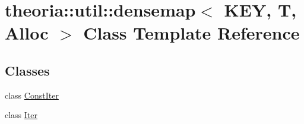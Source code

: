 \hypertarget{classtheoria_1_1util_1_1densemap}{\section{theoria\+:\+:util\+:\+:densemap$<$ K\+E\+Y, T, Alloc $>$ Class Template Reference}
\label{classtheoria_1_1util_1_1densemap}
}
\subsection*{Classes}
\begin{DoxyCompactItemize}
\item 
class \hyperlink{classtheoria_1_1util_1_1densemap_1_1ConstIter}{Const\+Iter}
\item 
class \hyperlink{classtheoria_1_1util_1_1densemap_1_1Iter}{Iter}
\end{DoxyCompactItemize}
